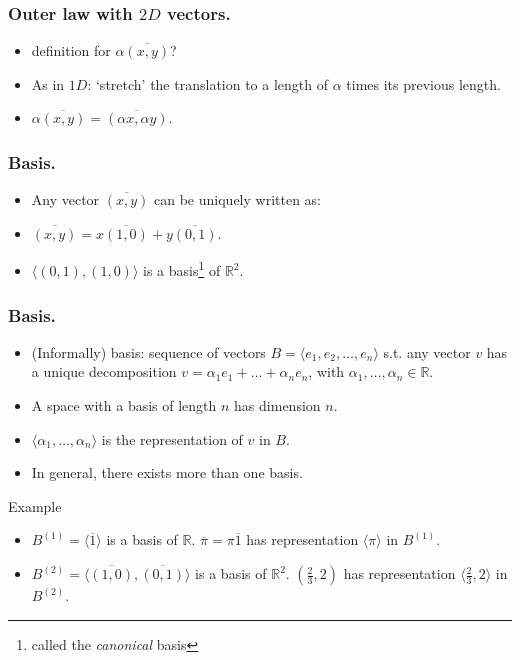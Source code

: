 \documentclass{beamer}
\begin{document}
\begin{frame}
  \frametitle{Outer law with $2D$ vectors.}
  \begin{itemize}
  \item definition for $\alpha \overline{(x,y)}$?
  \item As in $1D$: `stretch' the translation to a length of $\alpha$ times its previous length.
  \item $\alpha \overline{(x,y)} = \overline{(\alpha x, \alpha y)}$.
  \end{itemize}


\begin{center}
    
  \end{center}
\end{frame}

\begin{frame}
  \frametitle{Basis.}
  \begin{itemize}
  \item Any vector $\overline{(x,y)}$ can be uniquely written as:
  \item $\overline{(x,y)} = x\overline{(1,0)} + y \overline{(0,1)}$.
  \item \alert{$\langle (0,1), (1,0) \rangle$ is a basis\footnote{called the \emph{canonical} basis} of $\mathbb{R}^2$.}
  \end{itemize}

  \begin{center}
    
  \end{center}
  
\end{frame}

\begin{frame}
  \frametitle{Basis.}
  \begin{itemize}
  \item (Informally) basis: sequence of vectors $B = \langle e_1, e_2,\dots, e_n \rangle$ s.t. any vector $v$ has a unique decomposition $v = \alpha_1 e_1 + \dots +\alpha_n e_n$, with $\alpha_1, \dots, \alpha_n \in \mathbb{R}$.
  \item A space with a basis of length $n$ has dimension $n$.
  \item $\langle \alpha_1, \dots, \alpha_n \rangle$ is the representation of $v$ in $B$.
  \item In general, there exists more than one basis.
  \end{itemize}

  \begin{exampleblock}{Example}
    \begin{itemize}
    \item $B^{(1)} = \langle\overline 1\rangle$ is a basis of $\mathbb{R}$. $\overline \pi =\pi \overline 1 $ has representation $\langle \pi \rangle$ in $B^{(1)}$.
    \item $B^{(2)} = \langle \overline {(1,0)}, \overline{(0,1)} \rangle$ is a basis of $\mathbb{R}^2$. $(\frac{2}{3},2)$ has representation $\langle \frac{2}{3}, 2 \rangle$ in $B^{(2)}$.
    \end{itemize}
  \end{exampleblock}
\end{frame}
\end{document}
